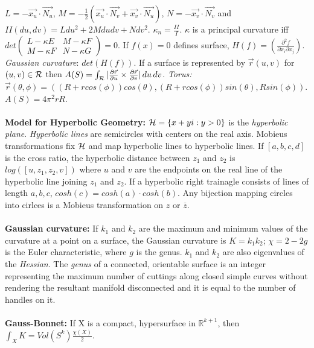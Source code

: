 $L= -{\vec {x_u}} \cdot {\vec {N_u}}$,
$M= -{\frac 1 2}(
{\vec {x_u}} \cdot {\vec {N_v}} + {\vec {x_v}} \cdot {\vec {N_u}})$,
$N= -{\vec {x_v}} \cdot {\vec {N_v}}$ and $II(du,dv)= L du^2 + 2M du dv +N dv^2$.
$\kappa_n= {\frac {II} {I}}$.  $\kappa$ is a principal curvature iff
$det \left(
\begin{array}{cc}
L- \kappa E &  M - \kappa F \\
M - \kappa F &  N - \kappa G
\end{array}
\right) =0$.  
If $f(x)=0$ defines surface, $H(f)= ({\frac {\partial^2 f} {\partial x_i \partial x_j}})$.
\emph{Gaussian curvature}: $det(H(f))$.
If a surface is represented by ${\vec r}(u,v)$ for $(u,v) \in {\cal R}$ then
$A(S)= \int_{{\cal R}} 
|{\frac {\partial {\vec r}} {\partial u}} \times
{\frac {\partial {\vec r}} {\partial v}}| \thinspace du \thinspace dv
$.  \emph{Torus:} ${\vec r}( \theta, \phi)= (
(R+r cos(\phi)) cos(\theta),
(R+r cos(\phi)) sin(\theta), R sin(\phi)) $.  $A(S)= 4 \pi^2 rR$.
\\
\\
{\bf Model for Hyperbolic Geometry:}
${\cal H}= \{ x+yi: y>0 \}$ is the \emph{hyperbolic plane}.  \emph{Hyperbolic lines} are
semicircles with centers on the real axis.  Mobieus transformations fix ${\cal H}$ and
map hyperbolic lines to hyperbolic lines. If $[a,b,c,d]$ is the cross ratio, the hyperbolic distance between
$z_1$ and $z_2$ is $log([u,z_1, z_2, v])$ where $u$ and $v$ are the endpoints on the real line of
the hyperbolic line joining $z_1$ and $z_2$.  If a hyperbolic right trainagle consists of lines
of length $a, b, c$, $cosh(c)= cosh(a) \cdot cosh(b)$.  Any bijection mapping circles into cirlces is
a Mobieus transformation on $z$ or ${\overline z}$.
\\
\\
{\bf Gaussian curvature:} If $k_1$ and $k_2$ are the maximum and minimum values
of the curvature at a point on a surface, the Gaussian curvature is $K= k_1 k_2$;
$\chi=2-2g$ is the Euler characteristic, where $g$ is the genus.  $k_1$ and $k_2$ are
also eigenvalues of the \emph{Hessian}.
The \emph{genus} of a connected, orientable surface is an 
integer representing the maximum number of cuttings along closed simple curves without 
rendering the resultant manifold disconnected and it is equal to the number 
of handles on it. 
\\
\\
{\bf Gauss-Bonnet:}  If X is a compact, hypersurface in ${\mathbb R}^{k+1}$, then
$\int_X K = Vol( S^k ){\frac {\chi (X)} {2}}$.
\\
